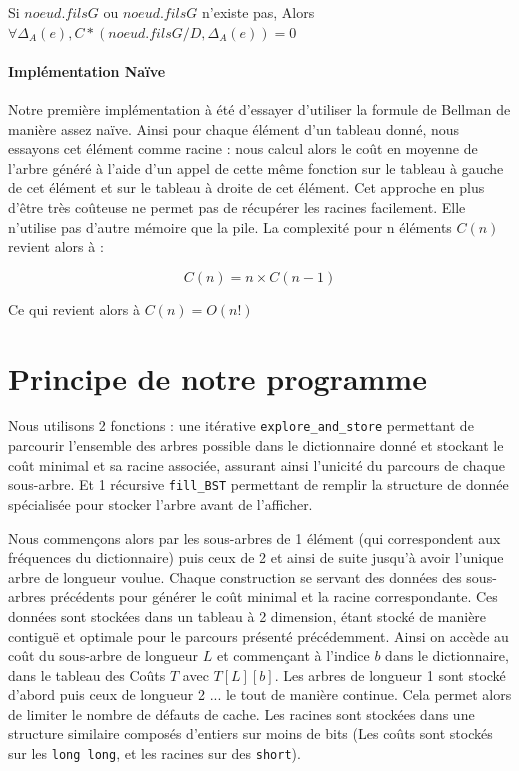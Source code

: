 \documentclass[a4paper, 10pt, french]{article}
\begin{document}
Si $noeud.filsG$ ou $noeud.filsG$ n'existe pas, Alors $\forall \Delta_{A}(e), C*(noeud.filsG/D, \Delta_{A}(e)) = 0$

\paragraph{Implémentation Naïve} Notre première implémentation à été d'essayer d'utiliser la formule de Bellman de manière assez naïve. Ainsi pour chaque élément d'un tableau donné, nous essayons cet élément comme racine : nous calcul alors le coût en moyenne de l'arbre généré à l'aide d'un appel de cette même fonction sur le tableau à gauche de cet élément et sur le tableau à droite de cet élément. Cet approche en plus d'être très coûteuse ne permet pas de récupérer les racines facilement. Elle n'utilise pas d'autre mémoire que la pile. La complexité pour n éléments $C(n)$ revient alors à :

\[ C(n) = n \times C(n-1) \]

Ce qui revient alors à $C(n) = O(n!)$

\newpage
\section{Principe de notre  programme}
Nous utilisons 2 fonctions : une itérative {\tt explore\_and\_store} permettant de parcourir l'ensemble des arbres possible dans le dictionnaire donné et stockant le coût minimal et sa racine associée, assurant ainsi l'unicité du parcours de chaque sous-arbre. Et 1 récursive {\tt fill\_BST} permettant de remplir la structure de donnée spécialisée pour stocker l'arbre avant de l'afficher.

Nous commençons alors par les sous-arbres de 1 élément (qui correspondent aux fréquences du dictionnaire) puis ceux de 2 et ainsi de suite jusqu'à avoir l'unique arbre de longueur voulue. Chaque construction se servant des données des sous-arbres précédents pour générer le coût minimal et la racine correspondante.
Ces données sont stockées dans un tableau à 2 dimension, étant stocké de manière contiguë et optimale pour le parcours présenté précédemment. Ainsi on accède au coût du sous-arbre de longueur $L$ et commençant à l'indice $b$ dans le dictionnaire, dans le tableau des Coûts $T$ avec $T[L][b]$. Les arbres de longueur 1 sont stocké d'abord puis ceux de longueur 2 ... le tout de manière continue. Cela permet alors de limiter le nombre de défauts de cache. Les racines sont stockées dans une structure similaire composés d'entiers sur moins de bits (Les coûts sont stockés sur les {\tt long long}, et les racines sur des {\tt short}).
\end{document}
